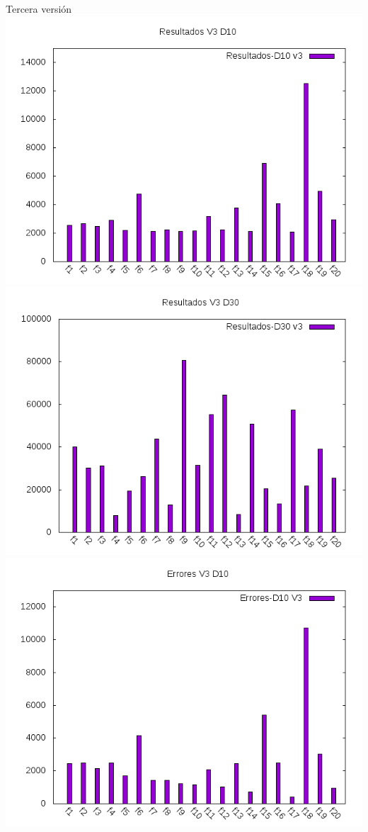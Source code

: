 \documentclass[10pt]{beamer}
\begin{document}
	\begin{frame}[fragile]{Tercera versión}
		\centering
		\includegraphics[scale=0.25]{./Imagenes/Resultados/resultados_v3_d10.png}
		\includegraphics[scale=0.25]{./Imagenes/Resultados/resultados_v3_d30.png}
		\includegraphics[scale=0.25]{./Imagenes/Errores/errores_v3_d10.png}

\end{frame}
\end{document}
